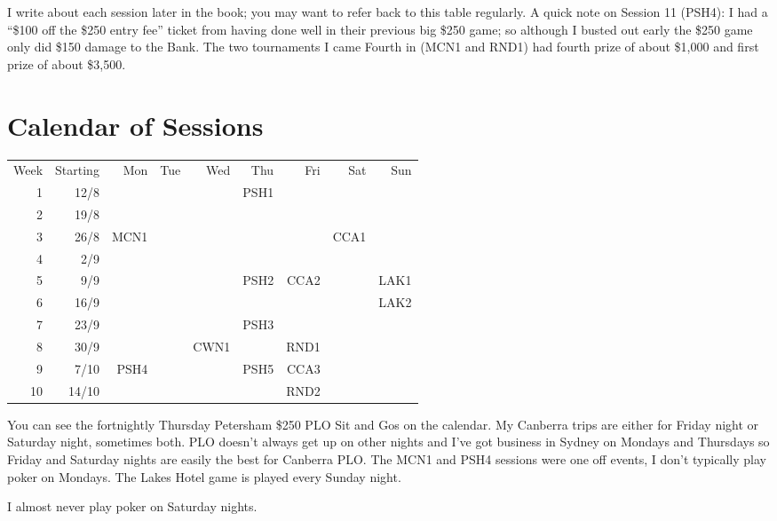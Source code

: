 I write about each session later in the book; you may want to
refer back to this table regularly. A quick note on Session 11 (PSH4): I had
a ``\$100 off the \$250 entry fee'' ticket from having done well in
their previous big \$250 game; so although I busted out early the \$250
game only did \$150 damage to the Bank. The two tournaments I came
Fourth in (MCN1 and RND1) had fourth prize of about \$1,000 and first
prize of about \$3,500.

\section*{Calendar of Sessions}

\begin{tabular}{rrrrrrrrr}
  Week & Starting & Mon & Tue & Wed & Thu & Fri & Sat & Sun \\
  1 & 12/8  &     &     &     & PSH1 &     &     &     \\
  2 & 19/8  &     &     &     &      &     &     &     \\
  3 & 26/8  & MCN1 &    &     &      &     & CCA1 &    \\
  4 & 2/9  &      &    &     &      &     &     &     \\
  5 &  9/9  &     &     &     & PSH2 & CCA2&     & LAK1\\
  6 & 16/9  &     &     &     &      &     &     & LAK2\\
  7 & 23/9  &     &     &     & PSH3 &     &     &     \\
  8 & 30/9  &     &     & CWN1&      & RND1&     &     \\
  9 & 7/10 & PSH4 &    &     & PSH5 & CCA3&     &     \\
 10 & 14/10 &     &     &     &      & RND2&     &     \\
\end{tabular}

You can see the fortnightly Thursday Petersham \$250 PLO Sit and Gos
on the calendar. My Canberra trips are either for Friday night or
Saturday night, sometimes both. PLO doesn't always get up on other
nights and I've got business in Sydney on Mondays and Thursdays so
Friday and Saturday nights are easily the best for Canberra PLO. The
MCN1 and PSH4 sessions were one off events, I don't typically play
poker on Mondays. The Lakes Hotel game is played every Sunday night.

I almost never play poker on Saturday nights.
